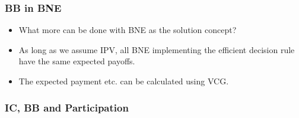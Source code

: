 \documentclass[11pt,a4paper,dvipdfmx]{article}
\theoremstyle{plain}
\newcommand{\1}{\mathbbm{1}}
\begin{document}
\subsubsection{BB in BNE}
\begin{itemize}
	\item What more can be done with BNE as the solution concept?
	\item As long as we assume IPV, all BNE implementing the efficient decision rule have the same expected payoffs.
	\item The expected payment etc. can be calculated using VCG.
\end{itemize}


\subsubsection{IC, BB and Participation}
\end{document}
